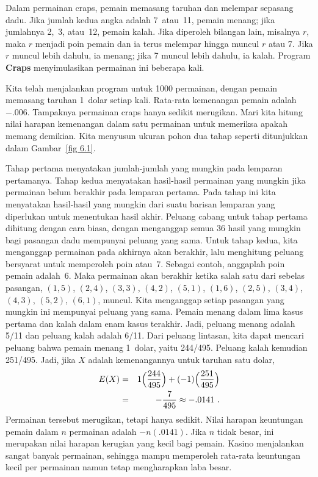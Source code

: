 \begin{example}\label{exam 6.6} Dalam permainan craps, pemain memasang taruhan dan
melempar sepasang dadu. Jika jumlah kedua angka adalah 7~atau~11, pemain menang; jika
jumlahnya 2,~3, atau~12, pemain kalah. Jika diperoleh bilangan lain, misalnya $r$,
maka $r$ menjadi poin pemain dan ia terus melempar hingga muncul $r$ atau 7. Jika $r$
muncul lebih dahulu, ia menang; jika 7 muncul lebih dahulu, ia kalah. Program
{\bf Craps} menyimulasikan permainan ini beberapa kali.
\par Kita telah menjalankan program untuk 1000 permainan, dengan pemain memasang
taruhan 1~dolar setiap kali. Rata-rata kemenangan pemain adalah $-.006$. Tampaknya
permainan craps hanya sedikit merugikan. Mari kita hitung nilai harapan kemenangan
dalam satu permainan untuk memeriksa apakah memang demikian. Kita menyusun ukuran
pohon dua tahap seperti ditunjukkan dalam Gambar~\ref{fig 6.1}.


Tahap pertama menyatakan jumlah-jumlah yang mungkin pada lemparan pertamanya. Tahap
kedua menyatakan hasil-hasil permainan yang mungkin jika permainan belum berakhir
pada lemparan pertama. Pada tahap ini kita menyatakan hasil-hasil yang mungkin dari
suatu barisan lemparan yang diperlukan untuk menentukan hasil akhir. Peluang cabang
untuk tahap pertama dihitung dengan cara biasa, dengan menganggap semua 36 hasil yang
mungkin bagi pasangan dadu mempunyai peluang yang sama. Untuk tahap kedua, kita
menganggap permainan pada akhirnya akan berakhir, lalu menghitung peluang bersyarat
untuk memperoleh poin atau~7. Sebagai contoh, anggaplah poin pemain adalah~6. Maka
permainan akan berakhir ketika salah satu dari sebelas pasangan, $(1,5)$, $(2,4)$,
$(3,3)$, $(4,2)$, $(5,1)$,
$(1,6)$, $(2,5)$,
$(3,4)$, $(4,3)$, $(5,2)$, $(6,1)$, muncul. Kita menganggap setiap pasangan yang
mungkin ini mempunyai peluang yang sama. Pemain menang dalam lima kasus pertama dan
kalah dalam enam kasus terakhir. Jadi, peluang menang adalah 5/11 dan peluang kalah
adalah 6/11. Dari peluang lintasan, kita dapat mencari peluang bahwa pemain menang
1~dolar, yaitu 244/495. Peluang kalah kemudian 251/495. Jadi, jika $X$ adalah
kemenangannya untuk taruhan satu dolar,
\begin{eqnarray*} E(X) & = & 1\Bigl(\frac {244}{495}\Bigr) + (-1)\Bigl(\frac
{251}{495}\Bigr) \\
     & = & -\frac {7}{495} \approx -.0141\ .
\end{eqnarray*} Permainan tersebut merugikan, tetapi hanya sedikit. Nilai harapan
keuntungan pemain dalam $n$ permainan adalah $-n(.0141)$. Jika $n$ tidak besar, ini
merupakan nilai harapan kerugian yang kecil bagi pemain. Kasino menjalankan sangat
banyak permainan, sehingga mampu memperoleh rata-rata keuntungan kecil per permainan
namun tetap mengharapkan laba besar.
\end{example}

